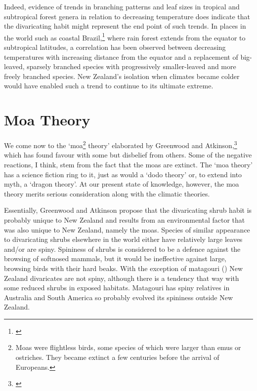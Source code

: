 Indeed, evidence of trends in branching patterns and leaf sizes in tropical and subtropical forest genera in relation to decreasing temperature does indicate that the divaricating habit might represent the end point of such trends.
In places in the world such as coastal Brazil,\footnote{\cite{cain1956applications}} where rain forest extends from the equator to subtropical latitudes, a correlation has been observed between decreasing temperatures with increasing distance from the equator and a replacement of big-leaved, sparsely branched species with progressively smaller-leaved and more freely branched species.
New Zealand's isolation when climates became colder would have enabled such a trend to continue to its ultimate extreme.

\section{Moa Theory}

We come now to the `moa\footnote{Moas were flightless birds, some species of which were larger than emus or ostriches. They became extinct a few centuries before the arrival of Europeans.} theory' elaborated by Greenwood and Atkinson,\footnote{\cite{greenwood1977evolution}} which has found favour with some but disbelief from others.
Some of the negative reactions, I think, stem from the fact that the moas are extinct.
The `moa theory' has a science fiction ring to it, just as would a `dodo theory' or, to extend into myth, a `dragon theory'.
At our present state of knowledge, however, the moa theory merits serious consideration along with the climatic theories.

Essentially, Greenwood and Atkinson propose that the divaricating shrub habit is probably unique to New Zealand and results from an environmental factor that was also unique to New Zealand, namely the moas.
Species of similar appearance to divaricating shrubs elsewhere in the world either have relatively large leaves and/or are spiny.
Spininess of shrubs is considered to be a defence against the browsing of softnosed mammals, but it would be ineffective against large, browsing birds with their hard beaks.
With the exception of matagouri () New Zealand divaricates are not spiny, although there is a tendency that way with some reduced shrubs in exposed habitats.  Matagouri has spiny relatives in Australia and South America so probably evolved its spininess outside New Zealand.

